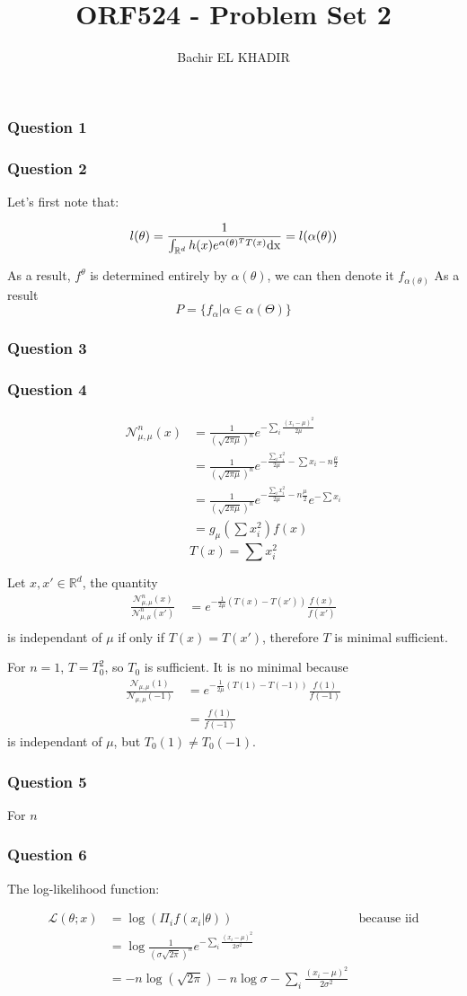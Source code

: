 \documentclass[12pt]{article}
\title{ORF524 - Problem Set 2}
\author{Bachir EL KHADIR }
\newcommand{\Q}[1]{\subsubsection*{Question #1}}
\begin{document}
\maketitle

\Q{1}
\Q{2}
Let's first note that:

$$l(\theta) = \frac{1}{\int_{\mathbb{R}^d} h(x) e^{\alpha(\theta)^T T(x)} \rm{d}x} = l(\alpha(\theta))$$

As a result, $f^{\theta}$ is determined entirely by $\alpha(\theta)$, we can then denote it $f_{\alpha(\theta)}$
As a result 
$$P = \{ f_{\alpha} | \alpha \in \alpha(\Theta) \}$$

\Q{3}


\Q{4}
\begin{align}
\mathcal{N}^n_{\mu, \mu}(x) 
&= \frac{1}{(\sqrt{2\pi\mu})^n} e^{-\sum_i \frac{(x_i-\mu)^2}{2\mu}} \\
&= \frac{1}{(\sqrt{2\pi\mu})^n} e^{ - \frac{\sum_i x_i^2}{2\mu} - \sum x_i - n\frac{\mu}{2}} \\
&= \frac{1}{(\sqrt{2\pi\mu})^n} e^{ - \frac{\sum_i x_i^2}{2\mu} - n\frac{\mu}{2}} e^{-\sum x_i} \\
&= g_{\mu}(\sum x_i^2) f(x)
\end{align}
$$T(x) = \sum x_i^2$$


Let $x, x' \in \mathbb{R}^d$, the quantity
\begin{align}
\frac{\mathcal{N}^n_{\mu, \mu}(x)}{\mathcal{N}^n_{\mu, \mu}(x')} \
&= e^{-\frac1{2\mu} (T(x) - T(x'))} \frac{f(x)}{f(x')} \\
\end{align}
is independant of $\mu$ if only if $T(x) = T(x')$, therefore $T$ is minimal sufficient.

For $n=1$, $T = T_0^2$, so $T_0$ is sufficient.
It is no minimal because
\begin{align}
\frac{\mathcal{N}_{\mu, \mu}(1)}{\mathcal{N}_{\mu, \mu}(-1)} \
&= e^{-\frac1{2\mu} (T(1) - T(-1))} \frac{f(1)}{f(-1)} \\
&= \frac{f(1)}{f(-1)}
\end{align}
is independant of $\mu$, but $T_0(1) \neq T_0(-1)$.
\Q{5}
For $n$


\Q{6}
The log-likelihood function:

\begin{align}
\mathcal{L}(\theta; x) &= \log(\Pi_i f(x_i | \theta)) & \text{because iid}\\
&= \log\frac{1}{(\sigma \sqrt{2\pi})^n} e^{-\sum_i \frac{(x_i-\mu)^2}{2\sigma^2}} \\
&= -n\log(\sqrt{2\pi}) - n \log \sigma -\sum_i \frac{(x_i-\mu)^2}{2\sigma^2} \\
\end{align}
\end{document}
